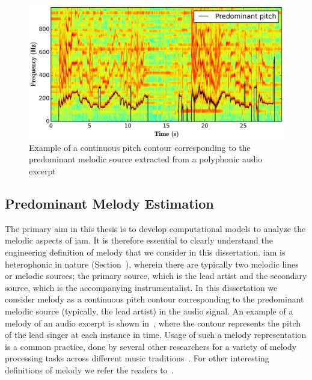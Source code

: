 {{\begin{figure}
	\begin{center}
		\includegraphics[width=\figSizeHundred]{ch05_preprocessing/figures/predominantMelodyExample.png}
	\end{center}
	\caption{Example of a continuous pitch contour corresponding to the predominant melodic source extracted from a polyphonic audio excerpt}
	\label{fig:predominant_melodic_fragment}
\end{figure}


\subsection{Predominant Melody Estimation}
\label{sec:data_preprocessing_predominant_melody_estimation}

The primary aim in this thesis is to develop computational models to analyze the melodic aspects of \gls{iam}. It is therefore essential to clearly understand the engineering definition of melody that we consider in this dissertation. \Gls{iam} is heterophonic in nature (Section~), wherein there are typically two melodic lines or melodic sources; the primary source, which is the lead artist and the secondary source, which is the accompanying instrumentalist. In this dissertation we consider melody as a continuous pitch contour corresponding to the predominant melodic source (typically, the lead artist) in the audio signal. An example of a melody of an audio excerpt is shown in~, where the contour represents the pitch of the lead singer at each instance in time. Usage of such a melody representation is a common practice, done by several other researchers for a variety of melody processing tasks across different music traditions~\citep{Dutta2014,Ishwar2013,Rao2014,koduri2014intonation,senturk2013score,pikrakis2012tracking}.  For other interesting definitions of melody we refer the readers to~\citep{Salamon2012}. 


}}
